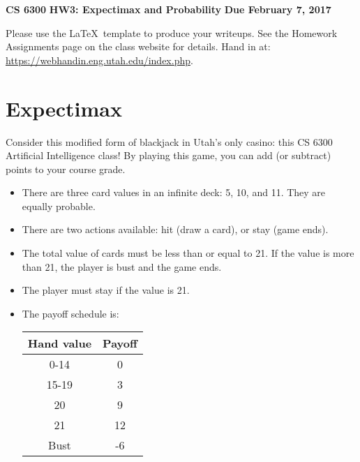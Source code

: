 \documentclass[12pt]{article}
\begin{document}
\begin{center}
{\bf CS 6300} \hfill {\large\bf HW3: Expectimax and Probability} \hfill {\bf Due February 7, 2017}
\end{center}

Please use the \LaTeX\ template to produce your writeups. See the
Homework Assignments page on the class website for details.  Hand in
at: \url{https://webhandin.eng.utah.edu/index.php}.

\section{Expectimax}

Consider this modified form of blackjack in Utah's only casino: this
CS 6300 Artificial Intelligence class!  By playing this game, you
can add (or subtract) points to your course grade.

\begin{itemize}

\item There are three card values in an infinite deck: 5, 10, and 11.
  They are equally probable.

\item There are two actions available: hit (draw a card), or stay
  (game ends).

\item The total value of cards must be less than or equal to 21.  If
  the value is more than 21, the player is bust and the game ends.

\item The player must stay if the value is 21.

\item The payoff schedule is:

      \begin{center}
      \begin{tabular}{c|c}\hline
        Hand value & Payoff \\ \hline
        0-14       & 0      \\
        15-19      & 3      \\
        20         & 9      \\
        21         & 12     \\
        Bust       & -6     \\ \hline
      \end{tabular}
      \end{center}

\end{itemize}
\end{document}
